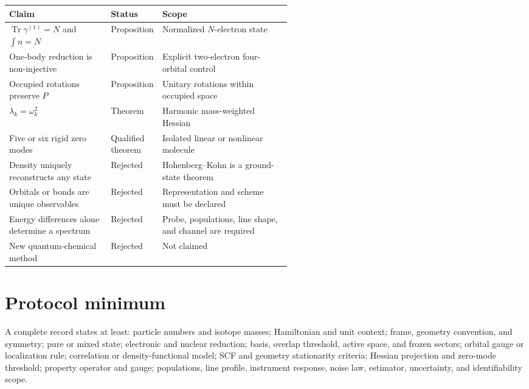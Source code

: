\documentclass[11pt,a4paper]{article}
\theoremstyle{definition}
\theoremstyle{plain}
\theoremstyle{remark}
\newcommand{\Tr}{\operatorname{Tr}}
\begin{document}
\begin{table}[ht]
\centering
\small
\begin{tabularx}{\linewidth}{L{0.36\linewidth} L{0.18\linewidth} Y}
\toprule
Claim & Status & Scope \\
\midrule
\(\Tr\gamma^{(1)}=N\) and \(\int n=N\) &
Proposition & Normalized \(N\)-electron state \\
One-body reduction is non-injective &
Proposition & Explicit two-electron four-orbital control \\
Occupied rotations preserve \(P\) &
Proposition & Unitary rotations within occupied space \\
\(\lambda_k=\omega_k^2\) &
Theorem & Harmonic mass-weighted Hessian \\
Five or six rigid zero modes &
Qualified theorem & Isolated linear or nonlinear molecule \\
Density uniquely reconstructs any state &
Rejected & Hohenberg--Kohn is a ground-state theorem \\
Orbitals or bonds are unique observables &
Rejected & Representation and scheme must be declared \\
Energy differences alone determine a spectrum &
Rejected & Probe, populations, line shape, and channel are required \\
New quantum-chemical method &
Rejected & Not claimed \\
\bottomrule
\end{tabularx}
\end{table}

\begin{center}
\end{center}

\section*{Protocol minimum}

A complete record states at least: particle numbers and isotope
masses; Hamiltonian and unit context; frame, geometry convention, and
symmetry; pure or mixed state; electronic and nuclear reduction;
basis, overlap threshold, active space, and frozen sectors; orbital
gauge or localization rule; correlation or density-functional model;
SCF and geometry stationarity criteria; Hessian projection and
zero-mode threshold; property operator and gauge; populations, line
profile, instrument response, noise law, estimator, uncertainty, and
identifiability scope.
\end{document}
